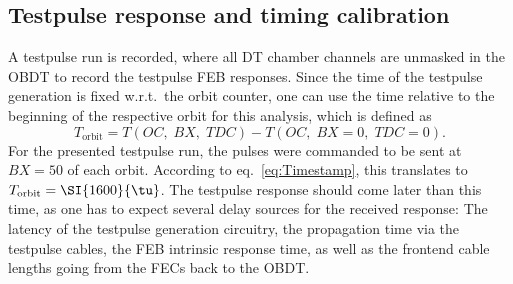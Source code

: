 \subsection{Testpulse response and timing calibration}
\label{sec:DTData-Testpulse-Calibration}
A testpulse run is recorded, where all \ac{DT} chamber channels are unmasked in the \ac{OBDT} to record the testpulse \ac{FEB} responses. Since the time of the testpulse generation is fixed w.r.t.\ the orbit counter, one can use the time relative to the beginning of the respective orbit for this analysis, which is defined as
\begin{equation}
    T_\text{orbit} = T(OC,\;BX,\;TDC) - T(OC,\;BX=0,\;TDC=0).
\end{equation}
For the presented testpulse run, the pulses were commanded to be sent at $BX=50$ of each orbit. According to eq.\ \ref{eq:Timestamp}, this translates to $T_\text{orbit}=\SI{1600}{\tu}$. The testpulse response should come later than this time, as one has to expect several delay sources for the received response: The latency of the testpulse generation circuitry, the propagation time via the testpulse cables, the \ac{FEB} intrinsic response time, as well as the frontend cable lengths going from the \acp{FEC} back to the \ac{OBDT}.
